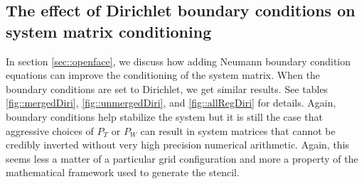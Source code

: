 \documentclass{article}
\begin{document}
{\subsection{The effect of Dirichlet boundary conditions on
  system matrix conditioning} In section \ref{sec::openface}, we
discuss how adding Neumann boundary condition equations can improve
the conditioning of the system matrix.  When the boundary conditions
are set to Dirichlet, we get similar results.  See tables
\ref{fig::mergedDiri}, \ref{fig::unmergedDiri}, and
\ref{fig::allRegDiri} for details.  Again, boundary conditions help
stabilize the system but it is still the case that aggressive choices
of $P_T$ or $P_W$ can result in system matrices that cannot be
credibly inverted without very high precision numerical arithmetic.
Again, this seems less a matter of a particular grid configuration and
more  a property of the mathematical framework used to generate the
stencil.

}
\end{document}

